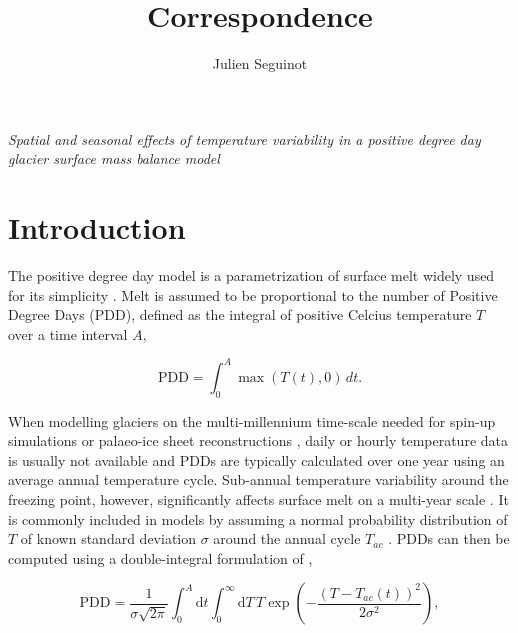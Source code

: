 \documentclass[twocolumn]{igs}
\begin{document}
\title[Correspondence]{Correspondence}
\author[J. Seguinot]{Julien Seguinot}

\maketitle


\emph{Spatial and seasonal effects of temperature variability in a positive degree day glacier surface mass balance model}

\section{Introduction}

The positive degree day model is a parametrization of surface melt widely used for its simplicity \citep{hock-2003}. Melt is assumed to be proportional to the number of Positive Degree Days (PDD), defined as the integral of positive Celcius temperature $T$ over a time interval $A$,

\begin{equation} \label{eq:pdd}
  \mathrm{PDD} = \int_{0}^{A}\max(T(t),0)\,dt.
\end{equation}

When modelling glaciers on the multi-millennium time-scale needed for spin-up simulations or palaeo-ice sheet reconstructions \citep[e.g.][]{charbit-etal-2013}, daily or hourly temperature data is usually not available and PDDs are typically calculated over one year using an average annual temperature cycle. Sub-annual temperature variability around the freezing point, however, significantly affects surface melt on a multi-year scale \citep{arnold-mackay-1964}. It is commonly included in models by assuming a normal probability distribution of $T$ of known standard deviation $\sigma$ around the annual cycle $T_{ac}$ \citep{braithwaite-1984}. PDDs can then be computed using a double-integral formulation of \citet{reeh-1991},

\begin{equation} \label{eq:reeh}
  \mathrm{PDD} = \frac{1}{\sigma\sqrt{2\pi}}
    \int_{0}^{A} \mathrm{d}t
    \int_{0}^{\infty} \mathrm{d}T \,
    T \exp\left({-\frac{(T-T_{ac}(t))^2}{2\sigma^2}}\right),
\end{equation}
\end{document}
